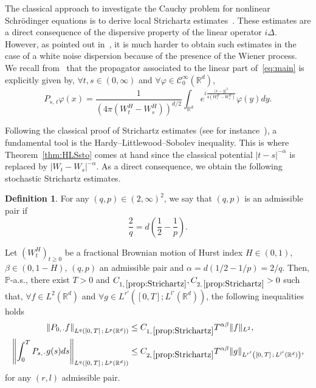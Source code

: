 \documentclass[10pt]{amsart}
\theoremstyle{definition}\newtheorem{defi}[theo]{Definition}\newtheorem{rema}[theo]{Remark}\newtheorem{exam}[theo]{Example}\newtheorem{exem}[theo]{Example}\newtheorem{nota}[theo]{Notation}
\newcommand{\bbP}{\mathbb{P}}
\newcommand{\bbR}{\mathbb{R}}
\newcommand{\clC}{\mathcal{C}}
\let\oldforall\forall
\renewcommand*{\forall}{\mathrel{\oldforall}}
\begin{document}
The classical approach to investigate the Cauchy problem for nonlinear Schr\"odinger equations is to derive local Strichartz estimates~\cite{cazenave2003semilinear}. These estimates are a direct consequence of the dispersive property of the linear operator $i\Delta$. However, as pointed out in~\cite{debussche20111d}, it is much harder to obtain such estimates in the case of a white noise dispersion because of the presence of the Wiener process. We recall from~\cite{de2010nonlinear,marty2006splitting} that the propagator associated to the linear part of~\eqref{eq:main} is explicitly given by, $\forall t,s\in (0,\infty)$ and $\forall \varphi\in\clC^{\infty}_0(\bbR^d)$,
\begin{equation}\label{eq:propagator}
P_{s,\,t}\varphi(x) = \frac{1}{\left(4\pi\left(W_t^H-W_s^H\right)\right)^{d/2}}\int_{\bbR^d} e^{i\frac{|x-y|^2}{4\left(W_t^H-W_s^H\right)}} \varphi(y)dy.
\end{equation}

Following the classical proof of Strichartz estimates (see for instance~\cite{keel1998endpoint}), a fundamental tool is the Hardy--Littlewood--Sobolev inequality. This is where Theorem~\ref{thm:HLSsto} comes at hand since the classical potential $|t-s|^{-\alpha}$ is replaced by $|W_t-W_s|^{-\alpha}$. As a direct consequence, we obtain the following stochastic Strichartz estimates.

\begin{defi}
For any $(q,p)\in (2,\infty)^2$, we say that $(q,p)$ is an admissible pair if
\[
\frac{2}{q} = d\left(\frac 1 2 - \frac 1 p \right).
\]
\end{defi}

\begin{prop}\label{prop:Strichartz}
Let $(W^H_t)_{t\geq 0}$ be a fractional Brownian motion of Hurst index $H\in (0,1)$, $\beta\in (0,1-H)$, $(q,p)$ an admissible pair and $\alpha = d(1/2-1/p)=2/q$. Then, $\bbP$-a.s., there exist $T>0$ and $C_{1,\,\ref{prop:Strichartz}},C_{2,\,\ref{prop:Strichartz}}>0$ such that, $\forall f\in L^2(\bbR^d)$ and $\forall g\in L^{r'}([0,T];L^{l'}(\bbR^d))$, the following inequalities holds
\begin{align}
\left\|P_{0,\,\cdot} f \right\|_{L^q\left([0,\,T]\,;\,L^p\left(\bbR^d\right)\right)}&\leq C_{1,\,\ref{prop:Strichartz}}T^{\alpha\beta}\|f\|_{L^2}\label{eq:Stri1}
,
\\
\left\|\int_0^T P_{s,\,\cdot}g(s)ds \right\|_{L^q\left([0,\,T]\,;\,L^p\left(\bbR^d\right)\right)} &\leq C_{2,\,\ref{prop:Strichartz}}T^{\alpha\beta} \|g\|_{L^{r'}\left([0,\,T]\,;\,L^{l'}\left(\bbR^d\right)\right)},\label{eq:Stri2}
\end{align}
for any $(r,l)$ admissible pair.
\end{prop}
\end{document}
